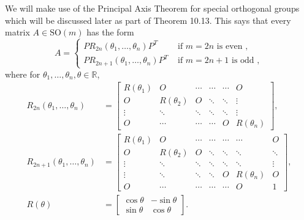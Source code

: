 \documentclass[10pt, letterpaper]{article}
\begin{document}
We will make use of the Principal Axis Theorem for special orthogonal groups which will be discussed later as part of Theorem 10.13. This says that every matrix $A \in \mathrm{SO}(m)$ has the form
$$
A= \begin{cases}P R_{2 n}\left(\theta_{1}, \ldots, \theta_{n}\right) P^{T} & \text { if } m=2 n \text { is even }, \\ P R_{2 n+1}\left(\theta_{1}, \ldots, \theta_{n}\right) P^{T} & \text { if } m=2 n+1 \text { is odd },\end{cases}
$$
where for $\theta_{1}, \ldots, \theta_{n}, \theta \in \mathbb{R}$,
$$
\begin{aligned}
R_{2 n}\left(\theta_{1}, \ldots, \theta_{n}\right) & =\left[\begin{array}{cccccc}
R\left(\theta_{1}\right) & O & \cdots & \cdots & \cdots & O \\
O & R\left(\theta_{2}\right) & O & \ddots & \ddots & \vdots \\
\vdots & \ddots & \ddots & \ddots & \ddots & \vdots \\
O & \cdots & \cdots & \cdots & O & R\left(\theta_{n}\right)
\end{array}\right], \\
R_{2 n+1}\left(\theta_{1}, \ldots, \theta_{n}\right) & =\left[\begin{array}{ccccccc}
R\left(\theta_{1}\right) & O & \cdots & \cdots & \cdots & \cdots & O \\
O & R\left(\theta_{2}\right) & O & \ddots & \ddots & \ddots & \ddots \\
\vdots & \ddots & \ddots & \ddots & \ddots & \ddots & \vdots \\
\vdots & \ddots & \ddots & \ddots & O & R\left(\theta_{n}\right) & O \\
O & \cdots & \cdots & \cdots & \cdots & O & 1
\end{array}\right], \\
R(\theta) & =\left[\begin{array}{cc}
\cos \theta & -\sin \theta \\
\sin \theta & \cos \theta
\end{array}\right] .
\end{aligned}
$$
\end{document}
